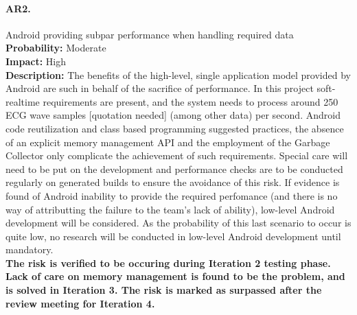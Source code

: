 		\paragraph{AR2.}Android providing subpar performance when handling required data\\
		\textbf{Probability:} Moderate\\
		\textbf{Impact:} High\\
		\textbf{Description:} The benefits of the high-level, single application model provided by Android are such in behalf of the sacrifice of performance. In this project soft-realtime requirements are present, and the system needs to process around 250 ECG wave samples [quotation needed] (among other data) per second. Android code reutilization and class based programming suggested practices, the absence of an explicit memory management API and the employment of the Garbage Collector only complicate the achievement of such requirements.  
		Special care will need to be put on the development and performance checks are to be conducted regularly on generated builds to ensure the avoidance of this risk.
		If evidence is found of Android inability to provide the required perfomance (and there is no way of attributting the failure to the team's lack of ability), low-level Android development will be considered. As the probability of this last scenario to occur is quite low, no research will be conducted in low-level Android development until mandatory.\\
		\textbf{The risk is verified to be occuring during Iteration 2 testing phase. Lack of care on memory management is found to be the problem, and is solved in Iteration 3. The risk is marked as surpassed after the review meeting for Iteration 4.}

